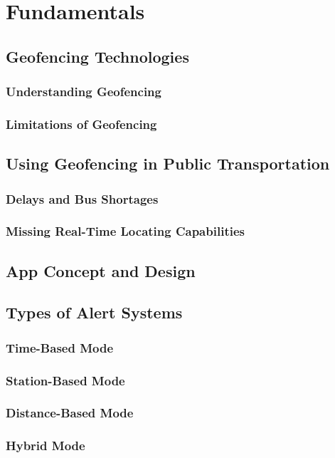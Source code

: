 \chapter{Fundamentals}
\label{cha:Fundamentals}

\section{Geofencing Technologies}
\subsection{Understanding Geofencing}
\subsection{Limitations of Geofencing}

\section{Using Geofencing in Public Transportation}
\subsection{Delays and Bus Shortages}
\subsection{Missing Real-Time Locating Capabilities}

\section{App Concept and Design}

\section{Types of Alert Systems}
\subsection{Time-Based Mode}

\subsection{Station-Based Mode}

\subsection{Distance-Based Mode}

\subsection{Hybrid Mode}


